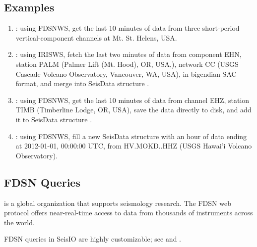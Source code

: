 \documentclass[letterpaper,11pt,english]{sphinxmanual}
\begin{document}
\subsection{Examples}
\label{\detokenize{src/Web/webclients:examples}}\begin{enumerate}
\def\theenumi{\arabic{enumi}}
\def\labelenumi{\theenumi .}
\makeatletter\def\p@enumii{\p@enumi \theenumi .}\makeatother
\item {} 
: using FDSNWS, get the last 10 minutes of data from three short-period vertical-component channels at Mt. St. Helens, USA.

\item {} 
: using IRISWS, fetch the last two minutes of data from component EHN, station PALM (Palmer Lift (Mt. Hood), OR, USA,), network CC (USGS Cascade Volcano Observatory, Vancouver, WA, USA), in bigendian SAC format, and merge into SeisData structure .

\item {} 
: using FDSNWS, get the last 10 minutes of data from channel EHZ, station TIMB (Timberline Lodge, OR, USA), save the data directly to disk, and add it to SeisData structure .

\item {} 
: using FDSNWS, fill a new SeisData structure  with an hour of data ending at 2012-01-01, 00:00:00 UTC, from HV.MOKD..HHZ (USGS Hawai’i Volcano Observatory).

\end{enumerate}


\subsection{FDSN Queries}
\label{\detokenize{src/Web/webclients:fdsn-queries}}
 is a global organization that supports seismology research. The FDSN web protocol offers near-real-time access to data from thousands of instruments across the world.

FDSN queries in SeisIO are highly customizable; see {\hyperref[\detokenize{src/Appendices/keywords:dkw}]{}} and {\hyperref[\detokenize{src/Appendices/web_syntax:cid}]{}}.
\end{document}
